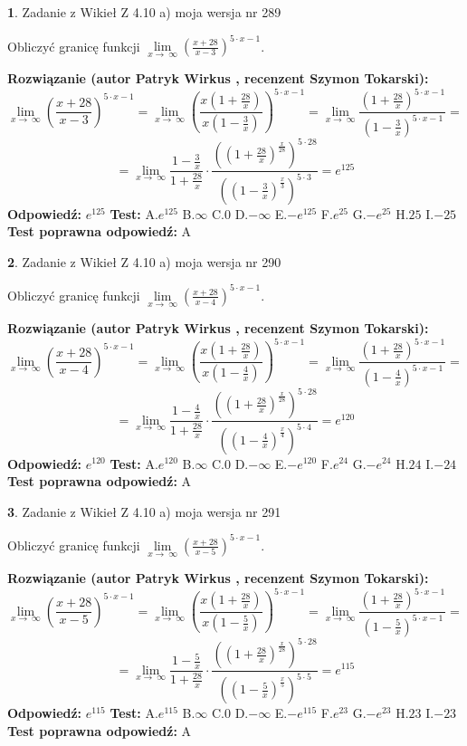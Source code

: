 \documentclass[12pt, a4paper]{article}
\theoremstyle{definition} %
\newtheorem{zad}{}
\newcommand{\zadStart}[1]{\begin{zad}#1\newline}
\newcommand{\zadStop}{\end{zad}}
\newcommand{\rozwStart}[2]{\noindent \textbf{Rozwiązanie (autor #1 , recenzent #2): }\newline}
\newcommand{\rozwStop}{\newline}
\newcommand{\odpStart}{\noindent \textbf{Odpowiedź:}\newline}
\newcommand{\odpStop}{\newline}
\newcommand{\testStart}{\noindent \textbf{Test:}\newline}
\newcommand{\testStop}{\newline}
\newcommand{\kluczStart}{\noindent \textbf{Test poprawna odpowiedź:}\newline}
\newcommand{\kluczStop}{\newline}
\begin{document}
\zadStart{Zadanie z Wikieł Z 4.10 a) moja wersja nr 289}

Obliczyć granicę funkcji  $\lim\limits_{x\to\ \infty}(\frac{x+28}{x-3})^{5\cdot x-1}$.
\zadStop
\rozwStart{Patryk Wirkus}{Szymon Tokarski}
$$\lim\limits_{x\to\ \infty}(\frac{x+28}{x-3})^{5\cdot x-1} = \lim\limits_{x\to\ \infty}(\frac{x(1+\frac{28}{x})}{x(1-\frac{3}{x})})^{5\cdot x-1}=\lim\limits_{x\to\ \infty}\frac{(1+\frac{28}{x})^{5\cdot x-1}}{(1-\frac{3}{x})^{5\cdot x-1}}=$$
$$=\lim\limits_{x\to\ \infty}\frac{1-\frac{3}{x}}{1+\frac{28}{x}}\cdot\frac{((1+\frac{28}{x})^{\frac{x}{28}})^{5\cdot28}}{((1-\frac{3}{x})^{\frac{x}{3}})^{5\cdot3}}=e^{125}$$
\rozwStop
\odpStart
$e^{125}$
\odpStop
\testStart
A.$e^{125}$ B.$\infty$ C.$0$ D.$-\infty$ E.$-e^{125}$
F.$e^{25}$ G.$-e^{25}$
H.$25$
I.$-25$
\testStop
\kluczStart
A
\kluczStop



\zadStart{Zadanie z Wikieł Z 4.10 a) moja wersja nr 290}

Obliczyć granicę funkcji  $\lim\limits_{x\to\ \infty}(\frac{x+28}{x-4})^{5\cdot x-1}$.
\zadStop
\rozwStart{Patryk Wirkus}{Szymon Tokarski}
$$\lim\limits_{x\to\ \infty}(\frac{x+28}{x-4})^{5\cdot x-1} = \lim\limits_{x\to\ \infty}(\frac{x(1+\frac{28}{x})}{x(1-\frac{4}{x})})^{5\cdot x-1}=\lim\limits_{x\to\ \infty}\frac{(1+\frac{28}{x})^{5\cdot x-1}}{(1-\frac{4}{x})^{5\cdot x-1}}=$$
$$=\lim\limits_{x\to\ \infty}\frac{1-\frac{4}{x}}{1+\frac{28}{x}}\cdot\frac{((1+\frac{28}{x})^{\frac{x}{28}})^{5\cdot28}}{((1-\frac{4}{x})^{\frac{x}{4}})^{5\cdot4}}=e^{120}$$
\rozwStop
\odpStart
$e^{120}$
\odpStop
\testStart
A.$e^{120}$ B.$\infty$ C.$0$ D.$-\infty$ E.$-e^{120}$
F.$e^{24}$ G.$-e^{24}$
H.$24$
I.$-24$
\testStop
\kluczStart
A
\kluczStop



\zadStart{Zadanie z Wikieł Z 4.10 a) moja wersja nr 291}

Obliczyć granicę funkcji  $\lim\limits_{x\to\ \infty}(\frac{x+28}{x-5})^{5\cdot x-1}$.
\zadStop
\rozwStart{Patryk Wirkus}{Szymon Tokarski}
$$\lim\limits_{x\to\ \infty}(\frac{x+28}{x-5})^{5\cdot x-1} = \lim\limits_{x\to\ \infty}(\frac{x(1+\frac{28}{x})}{x(1-\frac{5}{x})})^{5\cdot x-1}=\lim\limits_{x\to\ \infty}\frac{(1+\frac{28}{x})^{5\cdot x-1}}{(1-\frac{5}{x})^{5\cdot x-1}}=$$
$$=\lim\limits_{x\to\ \infty}\frac{1-\frac{5}{x}}{1+\frac{28}{x}}\cdot\frac{((1+\frac{28}{x})^{\frac{x}{28}})^{5\cdot28}}{((1-\frac{5}{x})^{\frac{x}{5}})^{5\cdot5}}=e^{115}$$
\rozwStop
\odpStart
$e^{115}$
\odpStop
\testStart
A.$e^{115}$ B.$\infty$ C.$0$ D.$-\infty$ E.$-e^{115}$
F.$e^{23}$ G.$-e^{23}$
H.$23$
I.$-23$
\testStop
\kluczStart
A
\kluczStop
\end{document}
